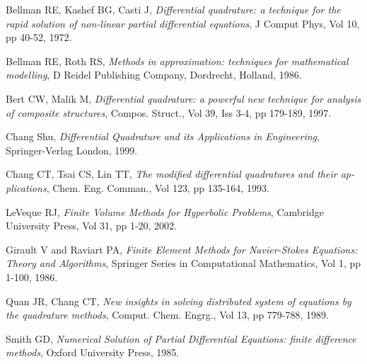 \documentclass{arabicClass}
\begin{document}
	
	\renewcommand{\theequation}{\arabic{equation}.\arabic{chapter}}
	
	\renewcommand{\arraystretch}{1.3}
	
	\abovedisplayskip=7pt
	\belowdisplayskip=7pt
	
	
	
	
	
		\tableofcontents
		\clearpage
	
	

	
	
	
	
	
	

	
\begin{thebibliography}{99}
	\begin{english}
		Bellman RE, Kashef BG, Casti J, \textit{Differential quadrature: a technique for the rapid solution of non-linear partial differential equations}, J Comput Phys, Vol 10, pp 40-52, 1972.
		
		Bellman RE, Roth RS, \textit{Methods in approximation: techniques for mathematical modelling}, D Reidel Publishing Company, Dordrecht, Holland, 1986.
		
		Bert CW, Malik M, \textit{Differential quadrature: a powerful new technique for analysis of composite structures}, Compos. Struct., Vol 39, Iss 3-4, pp 179-189, 1997.
		
		Chang Shu, \textit{Differential Quadrature and its Applications in Engineering}, Springer-Verlag London, 1999.
		
		Chang CT, Tsai CS, Lin TT, \textit{The modified differential quadratures and their applications}, Chem. Eng. Comman., Vol 123, pp 135-164, 1993.
		
		LeVeque RJ, \textit{Finite Volume Methods for Hyperbolic Problems}, Cambridge University Press, Vol 31, pp 1-20, 2002.
		
		Girault V and Raviart PA, \textit{Finite Element Methods for Navier-Stokes Equations: Theory and Algorithms}, Springer Series in Computational Mathematics, Vol 1, pp 1-100, 1986.
		
		Quan JR, Chang CT, \textit{New insights in solving distributed system of equations by the quadrature methods}, Comput. Chem. Engrg., Vol 13, pp 779-788, 1989.
		
		Smith GD, \textit{Numerical Solution of Partial Differential Equations: finite difference methods}, Oxford University Press, 1985.
		\end{english}
\end{thebibliography}


	
\end{document}

